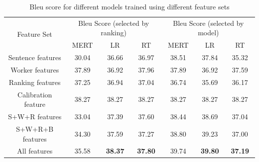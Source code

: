\documentclass[11pt]{article}
\begin{document}
\begin{table}[t]
\begin{center}

\begin{tabular}{|c|c|c|c|c|c|c|}
\hline
\multirow{2}{*}{Feature Set} & \multicolumn{3}{c|}{Bleu Score (selected by ranking)} & \multicolumn{3}{c|}{Bleu Score (selected by model)} \\ \cline{2-7} 
 & MERT      & LR \footnotemark[\ref{note2}]    & RT \footnotemark[\ref{note3}]    & MERT     & LR  \footnotemark[\ref{note2}]   & RT \footnotemark[\ref{note3}]     \\ \hline
Sentence features            & 30.04     & 36.66                & 36.97              & 38.51    & 37.84                & 35.32             \\ \hline
Worker features              & 37.89     & 36.92                & 37.96              & 37.89    & 36.92                & 37.59             \\ \hline
Ranking features             & 37.25     & 36.94                & 37.04              & 36.74    & 35.69                & 36.17             \\ \hline
Calibration feature          & 38.27     & 38.27                & 38.27              & 38.27    & 38.27                & 38.27             \\ \hline
S+W+R features\footnotemark[\ref{note4}]              & 33.04     & 37.39                & 37.60              & 38.44    & 38.69                & 37.04             \\ \hline
S+W+R+B features  \footnotemark[\ref{note5}]           & 34.30     & 37.59                & 37.27              & 38.80    & 39.23                & 37.00             \\ \hline
All features                 & 35.58     & \textbf{38.37}                & \textbf{37.80}              & 39.74    & \textbf{39.80}                & \textbf{37.19}             \\ \hline
\end{tabular}
\end{center}
\caption{\label{bleu} Bleu score for different models trained using different feature sets }
\end{table}
\end{document}
